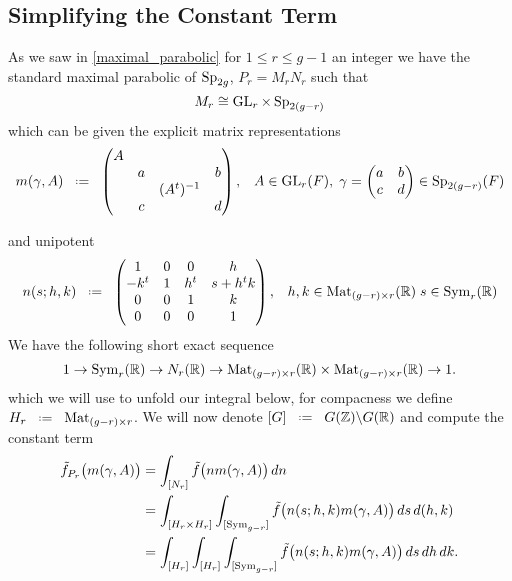 \subsection{Simplifying the Constant Term}
As we saw in \ref{maximal_parabolic} for \(1\leq r\leq g-1\) an integer we have the standard maximal parabolic of \(\operatorname{Sp}_{2g}\), \(P_r = M_rN_r\) such that 
\[M_r \cong \operatorname{GL}_r\times \operatorname{Sp}_{2(g-r)}\]
which can be given the explicit matrix representations 
    \[m(\gamma, A) \defeq \begin{pmatrix}
        A &&& \\
         &a&&b \\
         &&(A^t)\inv& \\
         &c&&d \\
    \end{pmatrix}, \;\;\; A\in \GL_r(F), \; \gamma = \begin{pmatrix}
        a & b\\
        c & d \\
    \end{pmatrix} \in \Sp_{2(g-r)}(F) \]

    and unipotent 
    \[ n(s;h,k) \defeq \begin{pmatrix} 1 & 0 & 0 & h\\ -k^t & 1 & h^t & s+h^t k\\ 0 & 0 & 1 & k\\ 0 & 0 & 0 & 1 \end{pmatrix}, \;\;\; h, k\in\mathrm{Mat}_{(g-r)\times r}(\R)\; s\in\mathrm{Sym}_{r}(\R)\]
We have the following short exact sequence 
\[ 1\to \mathrm{Sym}_{r}(\R)\to N_r(\R)\to \mathrm{Mat}_{(g-r)\times r}(\R)\times\mathrm{Mat}_{(g-r)\times r}(\R) \to 1. \]
which we will use to unfold our integral below, for compacness we define \(H_r \defeq \mathrm{Mat}_{(g-r)\times r}\). We will now denote \([G] \defeq G(\Z)\backslash G(\R)\) and compute the constant term
\begin{align}
		\tilde f_{P_r}\bigl(m(\gamma, A)\bigr)
		& = \int^{}_{[N_r]}\tilde f\bigl(n m(\gamma, A)\bigr)\,dn \notag\\
		& = \int^{}_{[H_r\times H_r]}\int^{}_{[\mathrm{Sym}_{g-r}]}\tilde f\bigl(n(s; h, k) m(\gamma, A)\bigr)\,ds\,d(h,k) \notag\\
		& = \int^{}_{[H_r]}\int^{}_{[H_r]}\int^{}_{[\mathrm{Sym}_{g-r}]}\tilde f\bigl(n(s; h, k) m(\gamma, A)\bigr)\,ds\,dh\,dk.
\end{align} 

